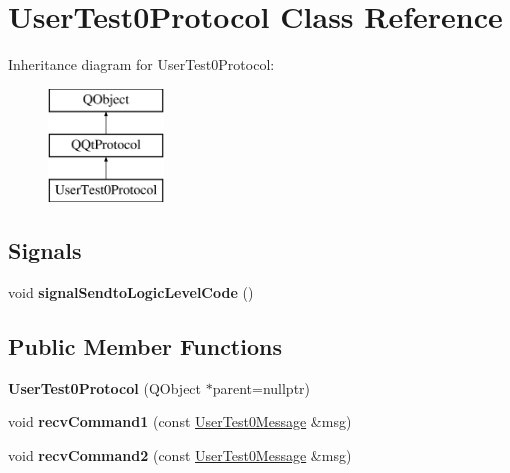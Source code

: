 \hypertarget{class_user_test0_protocol}{}\section{User\+Test0\+Protocol Class Reference}
\label{class_user_test0_protocol}
Inheritance diagram for User\+Test0\+Protocol\+:\begin{figure}[H]
\begin{center}
\leavevmode
\includegraphics[height=3.000000cm]{class_user_test0_protocol}
\end{center}
\end{figure}
\subsection*{Signals}
\begin{DoxyCompactItemize}
\item 
\mbox{\label{class_user_test0_protocol_a6688fdea882fcad98823e06e107fff67}} 
void {\bfseries signal\+Sendto\+Logic\+Level\+Code} ()
\end{DoxyCompactItemize}
\subsection*{Public Member Functions}
\begin{DoxyCompactItemize}
\item 
\mbox{\label{class_user_test0_protocol_a8b353466bd2dbef17d3b3df351fc7d10}} 
{\bfseries User\+Test0\+Protocol} (Q\+Object $\ast$parent=nullptr)
\item 
\mbox{\label{class_user_test0_protocol_a091f7b80c5d00c857a8c8cf279049209}} 
void {\bfseries recv\+Command1} (const \mbox{\hyperlink{class_user_test0_message}{User\+Test0\+Message}} \&msg)
\item 
\mbox{\label{class_user_test0_protocol_add7e31436170dd921a1368255c458e6a}} 
void {\bfseries recv\+Command2} (const \mbox{\hyperlink{class_user_test0_message}{User\+Test0\+Message}} \&msg)
\end{DoxyCompactItemize}
